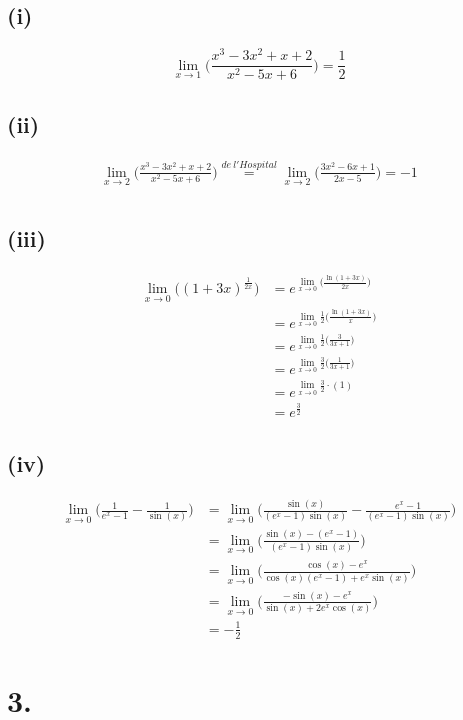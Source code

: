 \documentclass[a4paper]{scrartcl}
\begin{document}
\subsection{(i)}
\[\lim_{x\to 1}\bigg(\frac{x^3-3x^2+x+2}{x^2-5x+6}\bigg)=\frac{1}{2}\]
\subsection{(ii)}
\begin{align}
\lim_{x\to 2}\bigg(\frac{x^3-3x^2+x+2}{x^2-5x+6}\bigg)\stackrel{de\ l'Hospital}{=} \lim_{x\to 2}\bigg(\frac{3x^2-6x+1}{2x-5}\bigg)=-1\\
\end{align}
\subsection{(iii)}
\begin{align}
\lim_{x\to 0}\Big((1+3x)^{\frac{1}{2x}}\Big)&=e^{\lim\limits_{x\to 0}\Big(\frac{\ln(1+3x)}{2x}\Big)}\\
	&=e^{\lim\limits_{x\to 0}\frac{1}{2}\Big(\frac{\ln(1+3x)}{x}\Big)}\\
	&=e^{\lim\limits_{x\to 0}\frac{1}{2}\Big(\frac{3}{3x+1}\Big)}\\	
	&=e^{\lim\limits_{x\to 0}\frac{3}{2}\Big(\frac{1}{3x+1}\Big)}\\
	&=e^{\lim\limits_{x\to 0}\frac{3}{2}\cdot(1)}\\
	&=e^{\frac{3}{2}}
\end{align}
\newpage
\subsection{(iv)}
\begin{align}
\lim\limits_{x\to 0}\bigg(\frac{1}{e^x-1}-\frac{1}{\sin(x)}\bigg)&=\lim\limits_{x\to 0}\bigg(\frac{\sin(x)}{(e^x-1)\sin(x)}-\frac{e^x-1}{(e^x-1)\sin(x)}\bigg)\\
	&=\lim\limits_{x\to 0}\bigg(\frac{\sin(x)-(e^x-1)}{(e^x-1)\sin(x)}\bigg)\\
	&=\lim\limits_{x\to 0}\bigg(\frac{\cos(x)-e^x}{\cos(x)(e^x-1)+e^x\sin(x)}\bigg)\\
	&=\lim\limits_{x\to 0}\bigg(\frac{-\sin(x)-e^x}{\sin(x)+2e^x\cos(x)}\bigg)\\
	&=-\frac{1}{2}
\end{align}
\section{3.}
\end{document}
